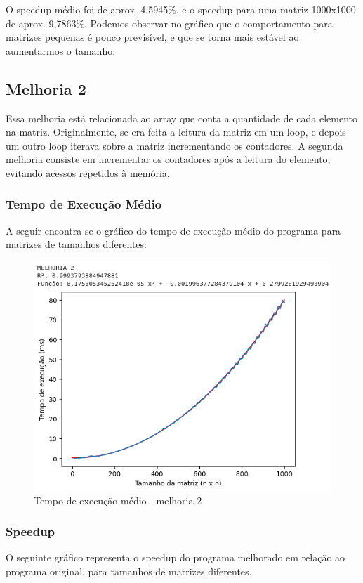O speedup médio foi de aprox. 4,5945\%, e o speedup para uma matriz 1000x1000 de aprox. 9,7863\%. Podemos observar no gráfico que o comportamento para matrizes pequenas é pouco previsível, e que se torna mais estável ao aumentarmos o tamanho.

\subsection{\esp Melhoria 2}
Essa melhoria está relacionada ao array que conta a quantidade de cada elemento na matriz. Originalmente, se era feita a leitura da matriz em um loop, e depois um outro loop iterava sobre a matriz incrementando os contadores. A segunda melhoria consiste em incrementar os contadores após a leitura do elemento, evitando acessos repetidos à memória.

\subsubsection{\esp Tempo de Execução Médio}
A seguir encontra-se o gráfico do tempo de execução médio do programa para matrizes de tamanhos diferentes: 

\begin{figure}[!ht]
	\centering	
	\caption[\hspace{0.1cm}Tempo de execução médio - melhoria 2]{Tempo de execução médio - melhoria 2}
	  \vspace{-0.4cm}
	\includegraphics[width=.8\textwidth]{figuras/melhoria2.png}
\end{figure}

\subsubsection{\esp Speedup}
O seguinte gráfico representa o speedup do programa melhorado em relação ao programa original, para tamanhos de matrizes diferentes.

